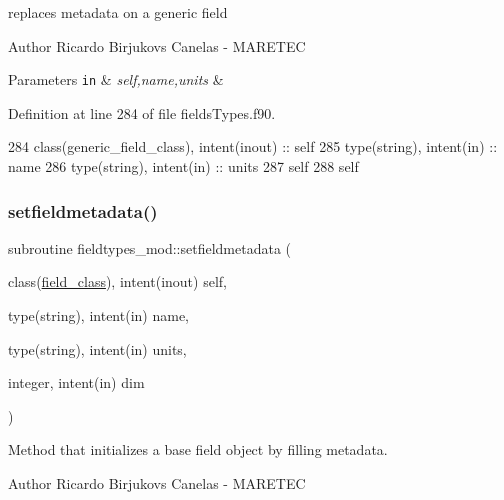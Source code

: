 replaces metadata on a generic field 

\begin{DoxyAuthor}{Author}
Ricardo Birjukovs Canelas -\/ M\+A\+R\+E\+T\+EC 
\end{DoxyAuthor}

\begin{DoxyParams}[1]{Parameters}
\mbox{\tt in}  & {\em self,name,units} & \\
\hline
\end{DoxyParams}


Definition at line 284 of file fields\+Types.\+f90.


\begin{DoxyCode}
284     \textcolor{keywordtype}{class}(generic\_field\_class), \textcolor{keywordtype}{intent(inout)} :: self
285     \textcolor{keywordtype}{type}(string), \textcolor{keywordtype}{intent(in)} :: name
286     \textcolor{keywordtype}{type}(string), \textcolor{keywordtype}{intent(in)} :: units
287     self%
288     self%
\end{DoxyCode}
\mbox{\label{namespacefieldtypes__mod_abc601ce9f8a974f426e876cc4c02e2a2}} 
\subsubsection{\texorpdfstring{setfieldmetadata()}{setfieldmetadata()}}
{\footnotesize\ttfamily subroutine fieldtypes\+\_\+mod\+::setfieldmetadata (\begin{DoxyParamCaption}\item[{class(\mbox{\hyperlink{structfieldtypes__mod_1_1field__class}{field\+\_\+class}}), intent(inout)}]{self,  }\item[{type(string), intent(in)}]{name,  }\item[{type(string), intent(in)}]{units,  }\item[{integer, intent(in)}]{dim }\end{DoxyParamCaption})\hspace{0.3cm}{\ttfamily [private]}}



Method that initializes a base field object by filling metadata. 

\begin{DoxyAuthor}{Author}
Ricardo Birjukovs Canelas -\/ M\+A\+R\+E\+T\+EC 
\end{DoxyAuthor}

